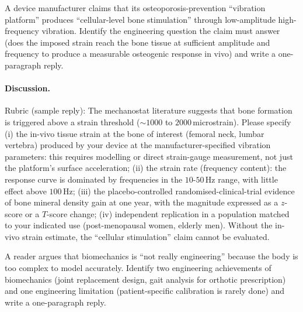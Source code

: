 \begin{exercise}
A device manufacturer claims that its osteoporosis-prevention
``vibration platform'' produces ``cellular-level bone stimulation''
through low-amplitude high-frequency vibration. Identify the
engineering question the claim must answer (does the imposed strain
reach the bone tissue at sufficient amplitude and frequency to
produce a measurable osteogenic response in vivo) and write a
one-paragraph reply.
\end{exercise}

\paragraph{Discussion.}
Rubric (sample reply): The mechanostat literature
\cite[p.~74]{paper:v6c06-frost-1987} suggests that bone formation is
triggered above a strain threshold ($\sim 1000$ to $2000\,$microstrain).
Please specify (i) the in-vivo tissue strain at the bone of interest
(femoral neck, lumbar vertebra) produced by your device at the
manufacturer-specified vibration parameters: this requires modelling
or direct strain-gauge measurement, not just the platform's surface
acceleration; (ii) the strain rate (frequency content): the response
curve is dominated by frequencies in the $10$-$50\,\text{Hz}$ range,
with little effect above $100\,\text{Hz}$; (iii) the
placebo-controlled randomised-clinical-trial evidence of bone
mineral density gain at one year, with the magnitude expressed as a
$z$-score or a $T$-score change; (iv) independent replication in a
population matched to your indicated use (post-menopausal women,
elderly men). Without the in-vivo strain estimate, the ``cellular
stimulation'' claim cannot be evaluated.

\begin{exercise}
A reader argues that biomechanics is ``not really engineering''
because the body is too complex to model accurately. Identify two
engineering achievements of biomechanics (joint replacement design,
gait analysis for orthotic prescription) and one engineering
limitation (patient-specific calibration is rarely done) and write
a one-paragraph reply.
\end{exercise}


